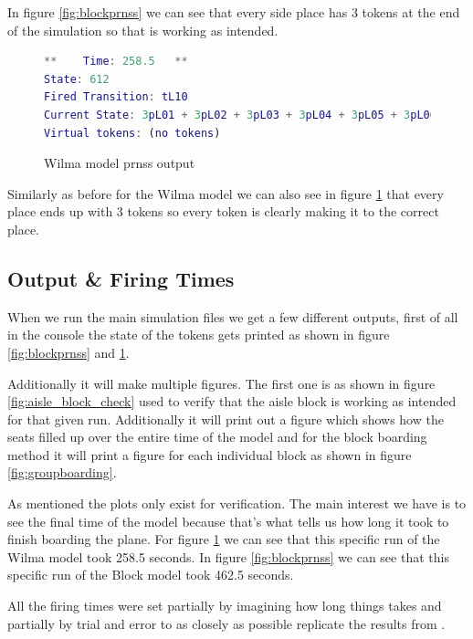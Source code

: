 \documentclass[english]{article}
\begin{document}
In figure \ref{fig:blockprnss} we can see that every side place has 3 tokens at the end of the simulation so that is working as intended.

\begin{figure}[H]
    \centering
    \begin{lstlisting}[language=MATLAB]
**    Time: 258.5   **
State: 612
Fired Transition: tL10
Current State: 3pL01 + 3pL02 + 3pL03 + 3pL04 + 3pL05 + 3pL06 + 3pL07 + 3pL08 + 3pL09 + 3pL10 + 3pL11 + 3pL12 + 3pR01 + 3pR02 + 3pR03 + 3pR04 + 3pR05 + 3pR06 + 3pR07 + 3pR08 + 3pR09 + 3pR10 + 3pR11 + 3pR12   
Virtual tokens: (no tokens)
\end{lstlisting}
    \caption{Wilma model prnss output}
    \label{fig:wilmaprnss}
\end{figure}

Similarly as before for the Wilma model we can also see in figure \ref{fig:wilmaprnss} that every place ends up with 3 tokens so every token is clearly making it to the correct place.

\subsection{Output \& Firing Times}
When we run the main simulation files we get a few different outputs, first of all in the console the state of the tokens gets printed as shown in figure \ref{fig:blockprnss} and \ref{fig:wilmaprnss}. 

Additionally it will make multiple figures. The first one is as shown in figure \ref{fig:aisle_block_check} used to verify that the aisle block is working as intended for that given run. Additionally it will print out a figure which shows how the seats filled up over the entire time of the model and for the block boarding method it will print a figure for each individual block as shown in figure \ref{fig:groupboarding}.

As mentioned the plots only exist for verification. The main interest we have is to see the final time of the model because that's what tells us how long it took to finish boarding the plane. For figure \ref{fig:wilmaprnss} we can see that this specific run of the Wilma model took 258.5 seconds. In figure \ref{fig:blockprnss} we can see that this specific run of the Block model took 462.5 seconds.

All the firing times were set partially by imagining how long things takes and partially by trial and error to as closely as possible replicate the results from \cite{STEFFEN201264}.
\end{document}
